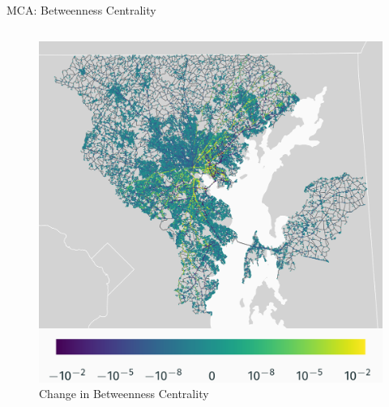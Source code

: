 \documentclass{beamer}
\numberwithin{figure}{section} %
\numberwithin{table}{section} %
\begin{document}
\begin{frame}{MCA: Betweenness Centrality}
\begin{columns}
        \begin{column}{0.33\textwidth}
            \begin{figure}
                \centering
                \includegraphics[width=\textwidth]{maps/betweenness_diff.png}
                {\scriptsize Change in Betweenness Centrality}
            \end{figure}
        \end{column}
    \end{columns}
\end{frame}
\end{document}
